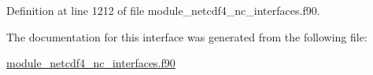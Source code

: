 Definition at line 1212 of file module\+\_\+netcdf4\+\_\+nc\+\_\+interfaces.\+f90.



The documentation for this interface was generated from the following file\+:\begin{DoxyCompactItemize}
\item 
\hyperlink{module__netcdf4__nc__interfaces_8f90}{module\+\_\+netcdf4\+\_\+nc\+\_\+interfaces.\+f90}\end{DoxyCompactItemize}
